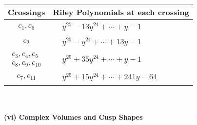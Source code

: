 \documentclass[1p]{elsarticle_modified}
\theoremstyle{definition}
\begin{document}
\begin{tabular}{m{50pt}|m{274pt}}
Crossings & \hspace{64pt}Riley Polynomials at each crossing \\
\hline $$\begin{aligned}c_{1},c_{6}\end{aligned}$$&$\begin{aligned}
&y^{25}-13 y^{24}+\cdots+y-1
\end{aligned}$\\
\hline $$\begin{aligned}c_{2}\end{aligned}$$&$\begin{aligned}
&y^{25}- y^{24}+\cdots+13 y-1
\end{aligned}$\\
\hline $$\begin{aligned}c_{3},c_{4},c_{5}\\c_{8},c_{9},c_{10}\end{aligned}$$&$\begin{aligned}
&y^{25}+35 y^{24}+\cdots+y-1
\end{aligned}$\\
\hline $$\begin{aligned}c_{7},c_{11}\end{aligned}$$&$\begin{aligned}
&y^{25}+15 y^{24}+\cdots+241 y-64
\end{aligned}$\\
\hline
\end{tabular}\\~\\
\newpage\flushleft \textbf{(vi) Complex Volumes and Cusp Shapes}
\end{document}
